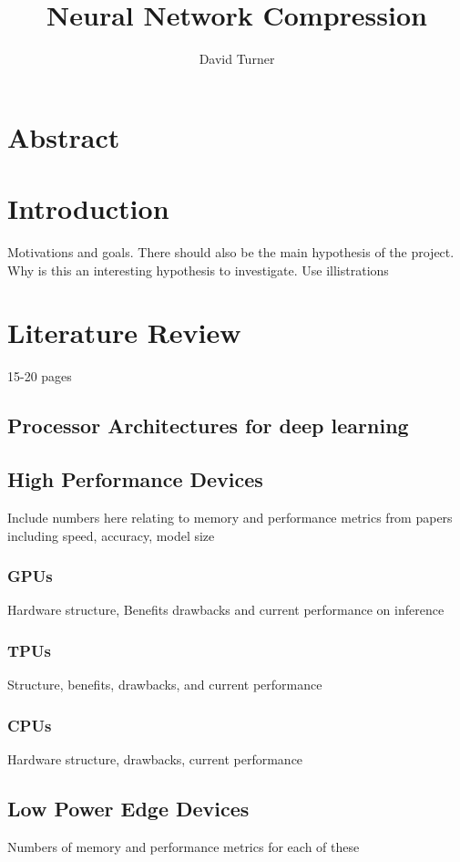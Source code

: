 \documentclass[12pt]{article}
\title{Neural Network Compression}
\author{David Turner}
\begin{document}
\begin{titlepage}
\maketitle
\end{titlepage}

\section{Abstract}

\section{Introduction}
Motivations and goals. There should also be the main hypothesis of the project. Why is this an interesting hypothesis to investigate. Use illistrations

\section{Literature Review}
15-20 pages
\subsection{Processor Architectures for deep learning}

\subsection{High Performance Devices}
Include numbers here relating to memory and performance metrics from papers including speed, accuracy, model size
\subsubsection{GPUs}
Hardware structure, Benefits drawbacks and current performance on inference
\subsubsection{TPUs}
Structure, benefits, drawbacks, and current performance
\subsubsection{CPUs}
Hardware structure, drawbacks, current performance

\subsection{Low Power Edge Devices}
Numbers of memory and performance metrics for each of these
\end{document}

